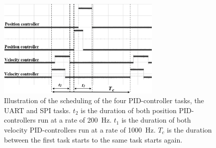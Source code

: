\documentclass[../../main.tex]{subfiles}
\begin{document}
\begin{figure}[H]
    \centering
    \includegraphics[width=0.7\textwidth]{Sections/Test/Images/TestMicrocontrollerTiming.png}
    \caption{Illustration of the scheduling of the four PID-controller tasks, the UART and SPI tasks. $t_2$ is the duration of both position PID-controllers run at a rate of \SI{200}{\hertz}. $t_1$ is the duration of both velocity PID-controllers run at a rate of \SI{1000}{\hertz}.  $T_c$ is the duration between the first task starts to the same task starts again. } 
    \label{fig:Schedueling_controllers}
\end{figure}
\end{document}
